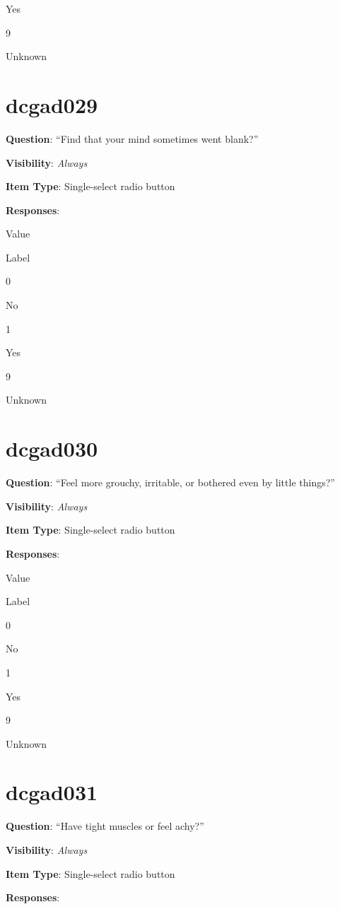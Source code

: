 \documentclass[]{book}
\begin{document}
Yes

9

Unknown

\hypertarget{dcgad029}{%
\section{dcgad029}\label{dcgad029}}

\textbf{Question}: ``Find that your mind sometimes went blank?''

\textbf{Visibility}: \emph{Always}

\textbf{Item Type}: Single-select radio button

\textbf{Responses}:

Value

Label

0

No

1

Yes

9

Unknown

\hypertarget{dcgad030}{%
\section{dcgad030}\label{dcgad030}}

\textbf{Question}: ``Feel more grouchy, irritable, or bothered even by little things?''

\textbf{Visibility}: \emph{Always}

\textbf{Item Type}: Single-select radio button

\textbf{Responses}:

Value

Label

0

No

1

Yes

9

Unknown

\hypertarget{dcgad031}{%
\section{dcgad031}\label{dcgad031}}

\textbf{Question}: ``Have tight muscles or feel achy?''

\textbf{Visibility}: \emph{Always}

\textbf{Item Type}: Single-select radio button

\textbf{Responses}:
\end{document}
